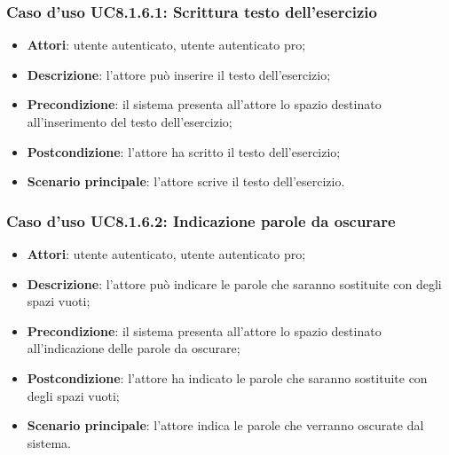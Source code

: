 \subsubsection{Caso d'uso UC8.1.6.1: Scrittura testo dell'esercizio}
	\begin{itemize}
		\item
			\textbf{Attori}: utente autenticato, utente autenticato pro;
		\item		
			\textbf{Descrizione}: l'attore può inserire il testo dell'esercizio;
		\item
			\textbf{Precondizione}: il sistema presenta all'attore lo spazio destinato all'inserimento del testo dell'esercizio; 
		\item
			\textbf{Postcondizione}: l'attore ha scritto il testo dell'esercizio;
		\item
			\textbf{Scenario principale}: l'attore scrive il testo dell'esercizio.
	\end{itemize}


\subsubsection{Caso d'uso UC8.1.6.2: Indicazione parole da oscurare}
	\begin{itemize}
		\item
			\textbf{Attori}: utente autenticato, utente autenticato pro;
		\item		
			\textbf{Descrizione}: l'attore può indicare le parole che saranno sostituite con degli spazi vuoti;
		\item
			\textbf{Precondizione}: il sistema presenta all'attore lo spazio destinato all'indicazione delle parole da oscurare;  
		\item
			\textbf{Postcondizione}: l'attore ha indicato le parole che saranno sostituite con degli spazi vuoti;
		\item
			\textbf{Scenario principale}: l'attore indica le parole che verranno oscurate dal sistema.
	\end{itemize}